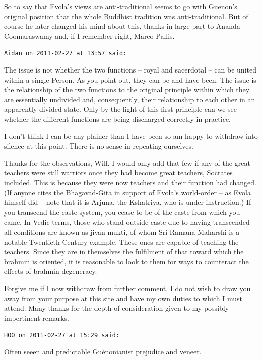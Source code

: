 \begin{footnotesize}
\begin{sffamily}
So to say that Evola's views are anti-traditional seems to go with Guenon's original position that the whole Buddhist tradition was anti-traditional. But of course he later changed his mind about this, thanks in large part to Ananda Coomaraswamy and, if I remember right, Marco Pallis.

\hfill

\texttt{Aidan on 2011-02-27 at 13:57 said:}

The issue is not whether the two functions -- royal and sacerdotal -- can be united within a single Person. As you point out, they can be and have been. The issue is the relationship of the two functions to the original principle within which they are essentially undivided and, consequently, their relationship to each other in an apparently divided state. Only by the light of this first principle can we see whether the different functions are being discharged correctly in practice.

I don't think I can be any plainer than I have been so am happy to withdraw into silence at this point. There is no sense in repeating ourselves.

Thanks for the observations, Will. I would only add that few if any of the great teachers were still warriors once they had become great teachers, Socrates included. This is because they were now teachers and their function had changed. (If anyone cites the Bhagavad-Gita in support of Evola's world-order -- as Evola himself did -- note that it is Arjuna, the Kshatriya, who is under instruction.) If you transcend the caste system, you cease to be of the caste from which you came. In Vedic terms, those who stand outside caste due to having transcended all conditions are known as jivan-mukti, of whom Sri Ramana Maharshi is a notable Twentieth Century example. These ones are capable of teaching the teachers. Since they are in themselves the fulfilment of that toward which the brahmin is oriented, it is reasonable to look to them for ways to counteract the effects of brahmin degeneracy.

Forgive me if I now withdraw from further comment. I do not wish to draw you away from your purpose at this site and have my own duties to which I must attend. Many thanks for the depth of consideration given to my possibly impertinent remarks.

\hfill

\texttt{HOO on 2011-02-27 at 15:29 said:}

Often seeen and predictable Guénonianist prejudice and veneer.


\end{sffamily}
\end{footnotesize}
